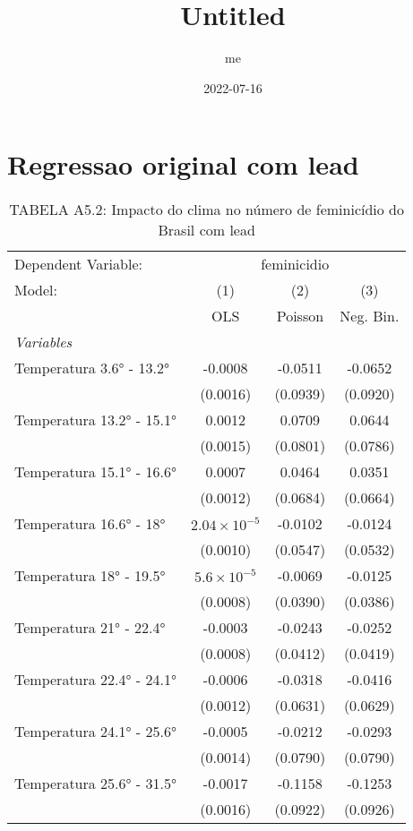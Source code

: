 \documentclass[
]{article}
\title{Untitled}
\author{me}
\date{2022-07-16}
\begin{document}
\maketitle

\hypertarget{regressao-original-com-lead}{%
\section{Regressao original com
lead}\label{regressao-original-com-lead}}

\begin{table}[htbp]
\centering
\caption{TABELA A5.2: Impacto do clima no número de feminicídio do Brasil com lead}
\begin{tabular}{lccc}
\tabularnewline\midrule\midrule
Dependent Variable:&\multicolumn{3}{c}{feminicidio}\\
Model:&(1) & (2) & (3)\\
 &  OLS & Poisson & Neg. Bin.\\
\midrule \emph{Variables}&   &   &  \\
Temperatura 3.6° - 13.2° & -0.0008 & -0.0511 & -0.0652\\
  &(0.0016) & (0.0939) & (0.0920)\\
Temperatura 13.2° - 15.1° & 0.0012 & 0.0709 & 0.0644\\
  &(0.0015) & (0.0801) & (0.0786)\\
Temperatura 15.1° - 16.6° & 0.0007 & 0.0464 & 0.0351\\
  &(0.0012) & (0.0684) & (0.0664)\\
Temperatura 16.6° - 18° & $2.04\times 10^{-5}$ & -0.0102 & -0.0124\\
  &(0.0010) & (0.0547) & (0.0532)\\
Temperatura 18° - 19.5° & $5.6\times 10^{-5}$ & -0.0069 & -0.0125\\
  &(0.0008) & (0.0390) & (0.0386)\\
Temperatura 21° - 22.4° & -0.0003 & -0.0243 & -0.0252\\
  &(0.0008) & (0.0412) & (0.0419)\\
Temperatura 22.4° - 24.1° & -0.0006 & -0.0318 & -0.0416\\
  &(0.0012) & (0.0631) & (0.0629)\\
Temperatura 24.1° - 25.6° & -0.0005 & -0.0212 & -0.0293\\
  &(0.0014) & (0.0790) & (0.0790)\\
Temperatura 25.6° - 31.5° & -0.0017 & -0.1158 & -0.1253\\
  &(0.0016) & (0.0922) & (0.0926)\\

\end{tabular}
\end{table}
\end{document}
